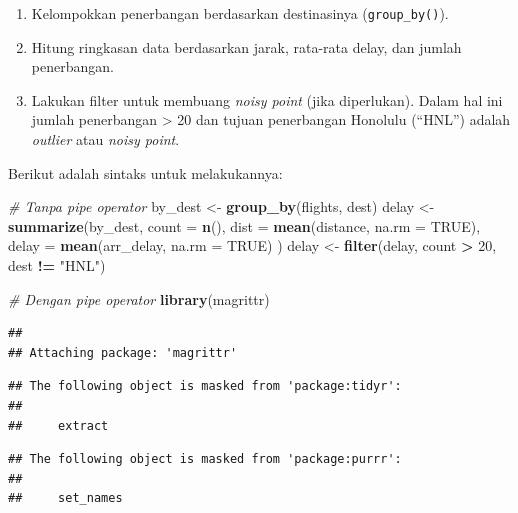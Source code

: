 \documentclass[]{book}
\newenvironment{Shaded}{\begin{snugshade}}{\end{snugshade}}
\newcommand{\KeywordTok}[1]{\textcolor[rgb]{0.13,0.29,0.53}{\textbf{#1}}}
\newcommand{\DataTypeTok}[1]{\textcolor[rgb]{0.13,0.29,0.53}{#1}}
\newcommand{\DecValTok}[1]{\textcolor[rgb]{0.00,0.00,0.81}{#1}}
\newcommand{\StringTok}[1]{\textcolor[rgb]{0.31,0.60,0.02}{#1}}
\newcommand{\CommentTok}[1]{\textcolor[rgb]{0.56,0.35,0.01}{\textit{#1}}}
\newcommand{\OtherTok}[1]{\textcolor[rgb]{0.56,0.35,0.01}{#1}}
\newcommand{\OperatorTok}[1]{\textcolor[rgb]{0.81,0.36,0.00}{\textbf{#1}}}
\newcommand{\NormalTok}[1]{#1}
\providecommand{\tightlist}{%
  \setlength{\itemsep}{0pt}\setlength{\parskip}{0pt}}
\begin{document}
\begin{enumerate}
\def\labelenumi{\arabic{enumi}.}
\tightlist
\item
  Kelompokkan penerbangan berdasarkan destinasinya
  (\texttt{group\_by()}).
\item
  Hitung ringkasan data berdasarkan jarak, rata-rata delay, dan jumlah
  penerbangan.
\item
  Lakukan filter untuk membuang \emph{noisy point} (jika diperlukan).
  Dalam hal ini jumlah penerbangan \textgreater{} 20 dan tujuan
  penerbangan Honolulu (``HNL'') adalah \emph{outlier} atau \emph{noisy
  point}.
\end{enumerate}

Berikut adalah sintaks untuk melakukannya:

\begin{Shaded}
\begin{Highlighting}[]
\CommentTok{# Tanpa pipe operator}
\NormalTok{by_dest <-}\StringTok{ }\KeywordTok{group_by}\NormalTok{(flights, dest)}
\NormalTok{delay <-}\StringTok{ }\KeywordTok{summarize}\NormalTok{(by_dest,}
  \DataTypeTok{count =} \KeywordTok{n}\NormalTok{(),}
  \DataTypeTok{dist =} \KeywordTok{mean}\NormalTok{(distance, }\DataTypeTok{na.rm =} \OtherTok{TRUE}\NormalTok{),}
  \DataTypeTok{delay =} \KeywordTok{mean}\NormalTok{(arr_delay, }\DataTypeTok{na.rm =} \OtherTok{TRUE}\NormalTok{)}
\NormalTok{)}
\NormalTok{delay <-}\StringTok{ }\KeywordTok{filter}\NormalTok{(delay, count }\OperatorTok{>}\StringTok{ }\DecValTok{20}\NormalTok{, dest }\OperatorTok{!=}\StringTok{ "HNL"}\NormalTok{)}

\CommentTok{# Dengan pipe operator}
\KeywordTok{library}\NormalTok{(magrittr)}
\end{Highlighting}
\end{Shaded}

\begin{verbatim}
## 
## Attaching package: 'magrittr'
\end{verbatim}

\begin{verbatim}
## The following object is masked from 'package:tidyr':
## 
##     extract
\end{verbatim}

\begin{verbatim}
## The following object is masked from 'package:purrr':
## 
##     set_names
\end{verbatim}
\end{document}
